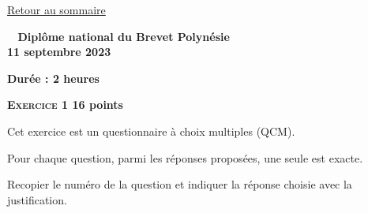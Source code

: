 \documentclass[11pt]{article}
\begin{document}
\hyperlink{sommaire}{Retour au sommaire}
\newpage
\hypertarget{Polynesiesep}{}
\label{Polynesiesep}

\pagestyle{fancy}
\thispagestyle{empty}
\begin{center}
{\Large\textbf{\decofourleft~ Diplôme national du Brevet Polynésie
 ~\decofourright}}\\[7pt]
{\Large \textbf{11 septembre 2023}}

\vspace{0,5cm}

\textbf{Durée : 2 heures}
\end{center}
\medskip

\textbf{{\large \textsc{Exercice 1}} \hfill 16 points}

\medskip

Cet exercice est un questionnaire à choix multiples (QCM).

Pour chaque question, parmi les réponses proposées, une seule est exacte.

Recopier le numéro de la question et indiquer la réponse choisie avec la justification.

\medskip
\end{document}
